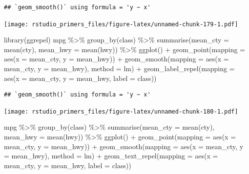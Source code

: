 \documentclass[
]{article}
\newenvironment{Shaded}{\begin{snugshade}}{\end{snugshade}}
\newcommand{\AttributeTok}[1]{\textcolor[rgb]{0.77,0.63,0.00}{#1}}
\newcommand{\FunctionTok}[1]{\textcolor[rgb]{0.00,0.00,0.00}{#1}}
\newcommand{\NormalTok}[1]{#1}
\newcommand{\SpecialCharTok}[1]{\textcolor[rgb]{0.00,0.00,0.00}{#1}}
\begin{document}
\begin{verbatim}
## `geom_smooth()` using formula = 'y ~ x'
\end{verbatim}

\texttt{[image: rstudio\_primers\_files/figure-latex/unnamed-chunk-179-1.pdf]}

\begin{Shaded}
\begin{Highlighting}[]
\FunctionTok{library}\NormalTok{(ggrepel)}
\NormalTok{mpg }\SpecialCharTok{\%\textgreater{}\%} 
  \FunctionTok{group\_by}\NormalTok{(class) }\SpecialCharTok{\%\textgreater{}\%} 
  \FunctionTok{summarise}\NormalTok{(}\AttributeTok{mean\_cty =} \FunctionTok{mean}\NormalTok{(cty), }\AttributeTok{mean\_hwy =} \FunctionTok{mean}\NormalTok{(hwy)) }\SpecialCharTok{\%\textgreater{}\%} 
  \FunctionTok{ggplot}\NormalTok{() }\SpecialCharTok{+}
    \FunctionTok{geom\_point}\NormalTok{(}\AttributeTok{mapping =} \FunctionTok{aes}\NormalTok{(}\AttributeTok{x =}\NormalTok{ mean\_cty, }\AttributeTok{y =}\NormalTok{ mean\_hwy)) }\SpecialCharTok{+}
    \FunctionTok{geom\_smooth}\NormalTok{(}\AttributeTok{mapping =} \FunctionTok{aes}\NormalTok{(}\AttributeTok{x =}\NormalTok{ mean\_cty, }\AttributeTok{y =}\NormalTok{ mean\_hwy), }\AttributeTok{method =}\NormalTok{ lm) }\SpecialCharTok{+}
    \FunctionTok{geom\_label\_repel}\NormalTok{(}\AttributeTok{mapping =} \FunctionTok{aes}\NormalTok{(}\AttributeTok{x =}\NormalTok{ mean\_cty, }\AttributeTok{y =}\NormalTok{ mean\_hwy, }\AttributeTok{label =}\NormalTok{ class))}
\end{Highlighting}
\end{Shaded}

\begin{verbatim}
## `geom_smooth()` using formula = 'y ~ x'
\end{verbatim}

\texttt{[image: rstudio\_primers\_files/figure-latex/unnamed-chunk-180-1.pdf]}

\begin{Shaded}
\begin{Highlighting}[]
\NormalTok{mpg }\SpecialCharTok{\%\textgreater{}\%} 
  \FunctionTok{group\_by}\NormalTok{(class) }\SpecialCharTok{\%\textgreater{}\%} 
  \FunctionTok{summarise}\NormalTok{(}\AttributeTok{mean\_cty =} \FunctionTok{mean}\NormalTok{(cty), }\AttributeTok{mean\_hwy =} \FunctionTok{mean}\NormalTok{(hwy)) }\SpecialCharTok{\%\textgreater{}\%} 
  \FunctionTok{ggplot}\NormalTok{() }\SpecialCharTok{+}
    \FunctionTok{geom\_point}\NormalTok{(}\AttributeTok{mapping =} \FunctionTok{aes}\NormalTok{(}\AttributeTok{x =}\NormalTok{ mean\_cty, }\AttributeTok{y =}\NormalTok{ mean\_hwy)) }\SpecialCharTok{+}
    \FunctionTok{geom\_smooth}\NormalTok{(}\AttributeTok{mapping =} \FunctionTok{aes}\NormalTok{(}\AttributeTok{x =}\NormalTok{ mean\_cty, }\AttributeTok{y =}\NormalTok{ mean\_hwy), }\AttributeTok{method =}\NormalTok{ lm) }\SpecialCharTok{+}
    \FunctionTok{geom\_text\_repel}\NormalTok{(}\AttributeTok{mapping =} \FunctionTok{aes}\NormalTok{(}\AttributeTok{x =}\NormalTok{ mean\_cty, }\AttributeTok{y =}\NormalTok{ mean\_hwy, }\AttributeTok{label =}\NormalTok{ class))}
\end{Highlighting}
\end{Shaded}
\end{document}
